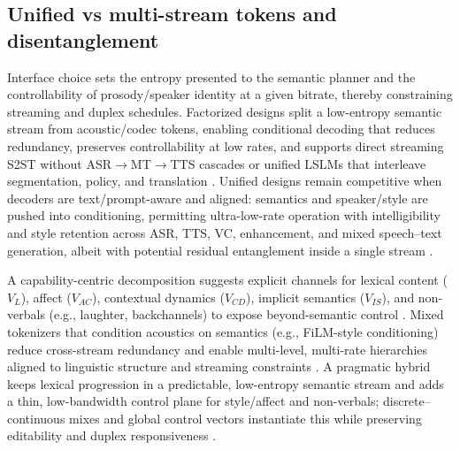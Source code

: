 \documentclass{article}
\begin{document}
\subsection{Unified vs multi-stream tokens and disentanglement} \label{subsec:Unified vs multi-stream tokens and disentanglement}

Interface choice sets the entropy presented to the semantic planner and the controllability of prosody/speaker identity at a given bitrate, thereby constraining streaming and duplex schedules. Factorized designs split a low-entropy semantic stream from acoustic/codec tokens, enabling conditional decoding that reduces redundancy, preserves controllability at low rates, and supports direct streaming S2ST without ASR$\rightarrow$MT$\rightarrow$TTS cascades or unified LSLMs that interleave segmentation, policy, and translation \cite{guo2025streamuniachievingstreamingspeechtransla,zhao2024textlessstreamingspeechtranslationsemant,yang2025diffsoundstreamefficientspeechtokenizati}. Unified designs remain competitive when decoders are text/prompt-aware and aligned: semantics and speaker/style are pushed into conditioning, permitting ultra-low-rate operation with intelligibility and style retention across ASR, TTS, VC, enhancement, and mixed speech--text generation, albeit with potential residual entanglement inside a single stream \cite{wang2025tadicodectextawarediffusionspeechtokeniz,wu2024speechcomposerunifyingmultiplespeechtask}.

A capability-centric decomposition suggests explicit channels for lexical content ($V_{L}$), affect ($V_{AC}$), contextual dynamics ($V_{CD}$), implicit semantics ($V_{IS}$), and non-verbals (e.g., laughter, backchannels) to expose beyond-semantic control \cite{wang2025bossbeyondsemanticspeech}. Mixed tokenizers that condition acoustics on semantics (e.g., FiLM-style conditioning) reduce cross-stream redundancy and enable multi-level, multi-rate hierarchies aligned to linguistic structure and streaming constraints \cite{yang2025diffsoundstreamefficientspeechtokenizati}. A pragmatic hybrid keeps lexical progression in a predictable, low-entropy semantic stream and adds a thin, low-bandwidth control plane for style/affect and non-verbals; discrete--continuous mixes and global control vectors instantiate this while preserving editability and duplex responsiveness \cite{yang2025diffsoundstreamefficientspeechtokenizati}.
\end{document}
